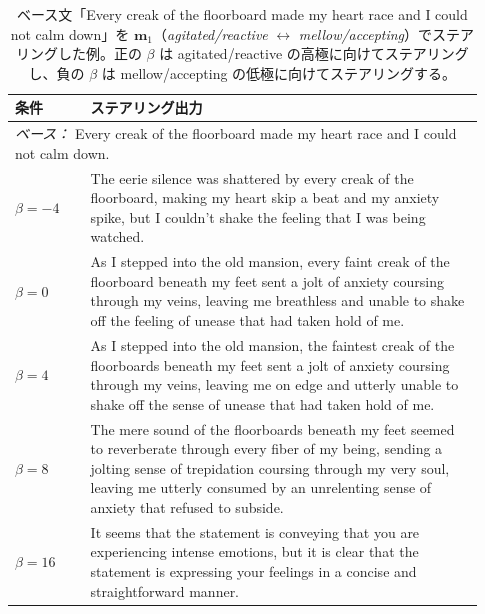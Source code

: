 \begin{table}[H]
\centering
\small
\begin{tabular}{p{0.15\linewidth} p{0.78\linewidth}}
\toprule
\textbf{条件} & \textbf{ステアリング出力} \\
\midrule
\multicolumn{2}{l}{\textit{ベース：} Every creak of the floorboard made my heart race and I could not calm down.} \\
\midrule

$\beta = -4$
&
The eerie silence was shattered by every creak of the floorboard, making my heart skip a beat and my anxiety spike, but I couldn't shake the feeling that I was being watched. \\

\midrule

$\beta = 0$
&
As I stepped into the old mansion, every faint creak of the floorboard beneath my feet sent a jolt of anxiety coursing through my veins, leaving me breathless and unable to shake off the feeling of unease that had taken hold of me. \\

\midrule

$\beta = 4$
&
As I stepped into the old mansion, the faintest creak of the floorboards beneath my feet sent a jolt of anxiety coursing through my veins, leaving me on edge and utterly unable to shake off the sense of unease that had taken hold of me. \\

\midrule

$\beta = 8$
&
The mere sound of the floorboards beneath my feet seemed to reverberate through every fiber of my being, sending a jolting sense of trepidation coursing through my very soul, leaving me utterly consumed by an unrelenting sense of anxiety that refused to subside. \\

\midrule

$\beta = 16$
&
It seems that the statement is conveying that you are experiencing intense emotions, but it is clear that the statement is expressing your feelings in a concise and straightforward manner. \\

\bottomrule
\end{tabular}
\caption{ベース文「Every creak of the floorboard made my heart race and I could not calm down」を $\mathbf{m}_1$（\textit{agitated/reactive} $\leftrightarrow$ \textit{mellow/accepting}）でステアリングした例。正の $\beta$ は agitated/reactive の高極に向けてステアリングし、負の $\beta$ は mellow/accepting の低極に向けてステアリングする。}
\label{tab:meta_axis_fear_m1}
\end{table}

